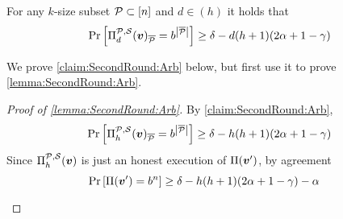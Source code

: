 \newcommand{\ds}{{d^\ast}}
\begin{claim}\label{claim:SecondRound:Arb}
For any $k$-size
subset $\mathcal{P}\subset [n]$ and $d\in (h)$ it holds that
\[
\Pr_{}\left[\Pi^{\mathcal{P},\mathcal{S}}_d({ \boldsymbol{v}})_{\overline{\mathcal{P}}} = b^{\left|{\overline{\mathcal{P}}}\right|}\right] \ge \delta- d (h+1)(2\alpha + 1-\gamma)
\]
\end{claim}
We prove \cref{claim:SecondRound:Arb} below, but first use it to prove \cref{lemma:SecondRound:Arb}.
\begin{proof}[Proof of \cref{lemma:SecondRound:Arb}]
By \cref{claim:SecondRound:Arb},
\begin{align*}
\Pr_{}\left[\Pi^{\mathcal{P},\mathcal{S}}_h({ \boldsymbol{v}})_{\overline{\mathcal{P}}} = b^{\left|{\overline{\mathcal{P}}}\right|}\right] \ge \delta - h(h+1)(2\alpha + 1-\gamma)
\end{align*}
Since $\Pi^{\mathcal{P},\mathcal{S}}_h({ \boldsymbol{v}})$ is just an honest execution of $\Pi({ \boldsymbol{v}}')$, by agreement
\begin{align*}
\Pr_{}\left[\Pi({ \boldsymbol{v}}') = b^n\right] &\ge \delta - h(h+1)(2\alpha + 1-\gamma) - \alpha
\end{align*}
\end{proof}





